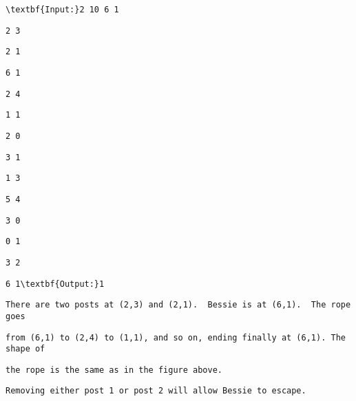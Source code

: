 \begin{verbatim}
\textbf{Input:}2 10 6 1 \end{verbatim}
\begin{verbatim}
2 3 \end{verbatim}
\begin{verbatim}
2 1 \end{verbatim}
\begin{verbatim}
6 1 \end{verbatim}
\begin{verbatim}
2 4 \end{verbatim}
\begin{verbatim}
1 1 \end{verbatim}
\begin{verbatim}
2 0 \end{verbatim}
\begin{verbatim}
3 1 \end{verbatim}
\begin{verbatim}
1 3 \end{verbatim}
\begin{verbatim}
5 4 \end{verbatim}
\begin{verbatim}
3 0 \end{verbatim}
\begin{verbatim}
0 1 \end{verbatim}
\begin{verbatim}
3 2 \end{verbatim}
\begin{verbatim}
6 1\textbf{Output:}1\end{verbatim}
\begin{verbatim}
There are two posts at (2,3) and (2,1).  Bessie is at (6,1).  The rope goes \end{verbatim}
\begin{verbatim}
from (6,1) to (2,4) to (1,1), and so on, ending finally at (6,1). The shape of \end{verbatim}
\begin{verbatim}
the rope is the same as in the figure above.\end{verbatim}
\begin{verbatim}
Removing either post 1 or post 2 will allow Bessie to escape.\end{verbatim}